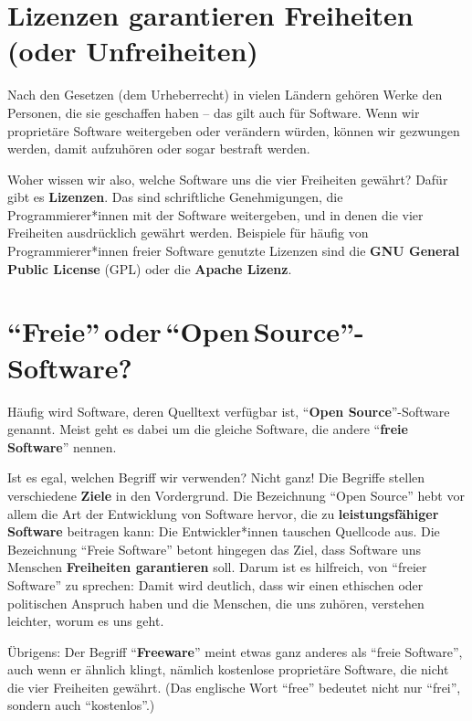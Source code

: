 \documentclass[a5paper,12pt]{scrartcl}
\begin{document}
\vspace{-8pt} %

\section{Lizenzen garantieren Freiheiten (oder Unfreiheiten)}

\vspace{-6pt} %

Nach den Gesetzen (dem Urheberrecht) in vielen Ländern gehören Werke
den Personen, die sie geschaffen haben -- das gilt auch für
Software. Wenn wir proprietäre Software weitergeben oder verändern
würden, können wir gezwungen werden, damit aufzuhören oder sogar
bestraft werden.

Woher wissen wir also, welche Software uns die vier Freiheiten
gewährt? Dafür gibt es \textbf{Lizenzen}. Das sind schriftliche
Genehmigungen, die Programmierer*innen mit der Software weitergeben,
und in denen die vier Freiheiten ausdrücklich gewährt
werden. Beispiele für häufig von Programmierer*innen freier Software
genutzte Lizenzen sind die \textbf{GNU General Public License} (GPL)
oder die \textbf{Apache Lizenz}.


\section{"`Freie"'\,oder\,"`Open\,Source"'-Software?}

Häufig wird Software, deren Quelltext verfügbar ist, "`\textbf{Open
  Source}"'-Software genannt. Meist geht es dabei um die gleiche
Software, die andere "`\textbf{freie Software}"' nennen.

Ist es egal, welchen Begriff wir verwenden? Nicht ganz! Die Begriffe
stellen verschiedene \textbf{Ziele} in den Vordergrund. Die
Bezeichnung "`Open Source"' hebt vor allem die Art der Entwicklung von
Software hervor, die zu \textbf{leistungsfähiger Software} beitragen
kann: Die Entwickler*innen tauschen Quellcode aus. Die Bezeichnung
"`Freie Software"' betont hingegen das Ziel, dass Software uns
Menschen \textbf{Freiheiten garantieren} soll. Darum ist es hilfreich,
von "`freier Software"' zu sprechen: Damit wird deutlich, dass wir
einen ethischen oder politischen Anspruch haben und die Menschen, die
uns zuhören, verstehen leichter, worum es uns geht.

Übrigens: Der Begriff "`\textbf{Freeware}"' meint etwas ganz anderes
als "`freie Software"', auch wenn er ähnlich klingt, nämlich
kostenlose proprietäre Software, die nicht die vier Freiheiten
gewährt. (Das englische Wort "`free"' bedeutet nicht nur "`frei"',
sondern auch "`kostenlos"'.)
\end{document}
